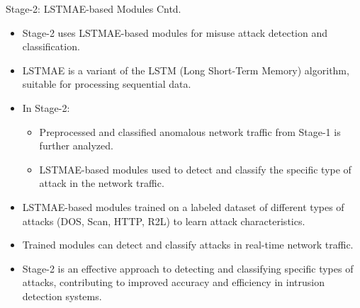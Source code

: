 \documentclass{beamer}
\begin{document}
\begin{frame}{Stage-2: LSTMAE-based Modules Cntd.}


  \begin{itemize}
    \item Stage-2 uses LSTMAE-based modules for misuse attack detection and classification.
    \item LSTMAE is a variant of the LSTM (Long Short-Term Memory) algorithm, suitable for processing sequential data.
    \item In Stage-2:
      \begin{itemize}
        \item Preprocessed and classified anomalous network traffic from Stage-1 is further analyzed.
        \item LSTMAE-based modules used to detect and classify the specific type of attack in the network traffic.
      \end{itemize}
    \item LSTMAE-based modules trained on a labeled dataset of different types of attacks (DOS, Scan, HTTP, R2L) to learn attack characteristics.
    \item Trained modules can detect and classify attacks in real-time network traffic.
    \item Stage-2 is an effective approach to detecting and classifying specific types of attacks, contributing to improved accuracy and efficiency in intrusion detection systems.
  \end{itemize}
\end{frame}
\end{document}
